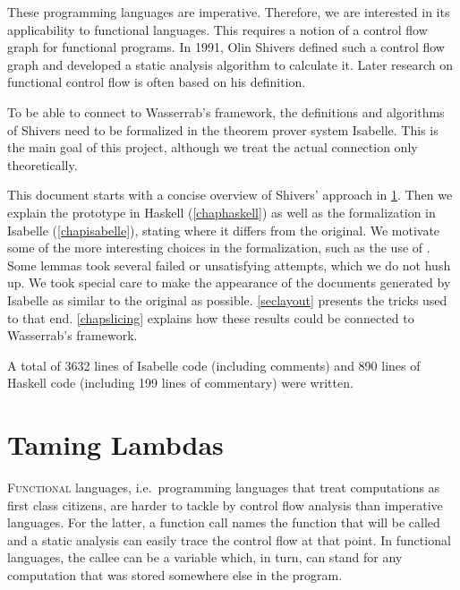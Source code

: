 \documentclass[a4paper,parskip=half,BCOR=8mm,DIV=calc,12pt]{scrbook}
\begin{document}
These programming languages are imperative. Therefore, we are interested in its applicability to functional languages. This requires a notion of a control flow graph for functional programs. In 1991, Olin Shivers defined such a control flow graph and developed a static analysis algorithm to calculate it. Later research on functional control flow is often based on his definition.

To be able to connect to Wasserrab’s framework, the definitions and algorithms of Shivers need to be formalized in the theorem prover system Isabelle. This is the main goal of this project, although we treat the actual connection only theoretically.

This document starts with a concise overview of Shivers’ approach in \cref{chapshivers}. Then we explain the prototype in Haskell (\cref{chaphaskell}) as well as the formalization in Isabelle (\cref{chapisabelle}), stating where it differs from the original. We motivate some of the more interesting choices in the formalization, such as the use of . Some lemmas took several failed or unsatisfying attempts, which we do not hush up. We took special care to make the appearance of the documents generated by Isabelle as similar to the original as possible. \cref{seclayout} presents the tricks used to that end. \cref{chapslicing} explains how these results could be connected to Wasserrab’s framework.

\enlargethispage{2em}
A total of 3632 lines of Isabelle code (including comments) and 890 lines of Haskell code (including 199 lines of commentary) were written.


% 

\chapter{Taming Lambdas}
\label{chapshivers}

\lettrine F{unctional} languages, i.e.\ programming languages that treat computations as first class citizens, are harder to tackle by control flow analysis than imperative languages. For the latter, a function call names the function that will be called and a static analysis can easily trace the control flow at that point. In functional languages, the callee can be a variable which, in turn, can stand for any computation that was stored somewhere else in the program.
\end{document}
